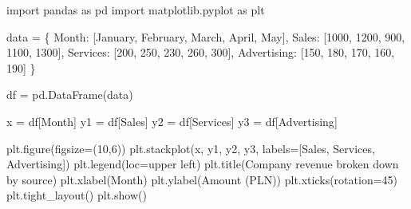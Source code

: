 \documentclass[
  english,
  letterpaper,
  DIV=11,
  numbers=noendperiod]{scrreprt}
\newenvironment{Shaded}{\begin{snugshade}}{\end{snugshade}}
\newcommand{\DecValTok}[1]{\textcolor[rgb]{0.68,0.00,0.00}{#1}}
\newcommand{\ImportTok}[1]{\textcolor[rgb]{0.00,0.46,0.62}{#1}}
\newcommand{\NormalTok}[1]{\textcolor[rgb]{0.00,0.23,0.31}{#1}}
\newcommand{\OperatorTok}[1]{\textcolor[rgb]{0.37,0.37,0.37}{#1}}
\newcommand{\StringTok}[1]{\textcolor[rgb]{0.13,0.47,0.30}{#1}}
\begin{document}
\begin{Shaded}
\begin{Highlighting}[]
\ImportTok{import}\NormalTok{ pandas }\ImportTok{as}\NormalTok{ pd}
\ImportTok{import}\NormalTok{ matplotlib.pyplot }\ImportTok{as}\NormalTok{ plt}

\NormalTok{data }\OperatorTok{=}\NormalTok{ \{}
    \StringTok{\textquotesingle{}Month\textquotesingle{}}\NormalTok{: [}\StringTok{\textquotesingle{}January\textquotesingle{}}\NormalTok{, }\StringTok{\textquotesingle{}February\textquotesingle{}}\NormalTok{, }\StringTok{\textquotesingle{}March\textquotesingle{}}\NormalTok{, }\StringTok{\textquotesingle{}April\textquotesingle{}}\NormalTok{, }\StringTok{\textquotesingle{}May\textquotesingle{}}\NormalTok{],}
    \StringTok{\textquotesingle{}Sales\textquotesingle{}}\NormalTok{: [}\DecValTok{1000}\NormalTok{, }\DecValTok{1200}\NormalTok{, }\DecValTok{900}\NormalTok{, }\DecValTok{1100}\NormalTok{, }\DecValTok{1300}\NormalTok{],}
    \StringTok{\textquotesingle{}Services\textquotesingle{}}\NormalTok{: [}\DecValTok{200}\NormalTok{, }\DecValTok{250}\NormalTok{, }\DecValTok{230}\NormalTok{, }\DecValTok{260}\NormalTok{, }\DecValTok{300}\NormalTok{],}
    \StringTok{\textquotesingle{}Advertising\textquotesingle{}}\NormalTok{: [}\DecValTok{150}\NormalTok{, }\DecValTok{180}\NormalTok{, }\DecValTok{170}\NormalTok{, }\DecValTok{160}\NormalTok{, }\DecValTok{190}\NormalTok{]}
\NormalTok{\}}

\NormalTok{df }\OperatorTok{=}\NormalTok{ pd.DataFrame(data)}

\NormalTok{x }\OperatorTok{=}\NormalTok{ df[}\StringTok{\textquotesingle{}Month\textquotesingle{}}\NormalTok{]}
\NormalTok{y1 }\OperatorTok{=}\NormalTok{ df[}\StringTok{\textquotesingle{}Sales\textquotesingle{}}\NormalTok{]}
\NormalTok{y2 }\OperatorTok{=}\NormalTok{ df[}\StringTok{\textquotesingle{}Services\textquotesingle{}}\NormalTok{]}
\NormalTok{y3 }\OperatorTok{=}\NormalTok{ df[}\StringTok{\textquotesingle{}Advertising\textquotesingle{}}\NormalTok{]}

\NormalTok{plt.figure(figsize}\OperatorTok{=}\NormalTok{(}\DecValTok{10}\NormalTok{,}\DecValTok{6}\NormalTok{))}
\NormalTok{plt.stackplot(x, y1, y2, y3, labels}\OperatorTok{=}\NormalTok{[}\StringTok{\textquotesingle{}Sales\textquotesingle{}}\NormalTok{, }\StringTok{\textquotesingle{}Services\textquotesingle{}}\NormalTok{, }\StringTok{\textquotesingle{}Advertising\textquotesingle{}}\NormalTok{])}
\NormalTok{plt.legend(loc}\OperatorTok{=}\StringTok{\textquotesingle{}upper left\textquotesingle{}}\NormalTok{)}
\NormalTok{plt.title(}\StringTok{\textquotesingle{}Company revenue broken down by source\textquotesingle{}}\NormalTok{)}
\NormalTok{plt.xlabel(}\StringTok{\textquotesingle{}Month\textquotesingle{}}\NormalTok{)}
\NormalTok{plt.ylabel(}\StringTok{\textquotesingle{}Amount (PLN)\textquotesingle{}}\NormalTok{)}
\NormalTok{plt.xticks(rotation}\OperatorTok{=}\DecValTok{45}\NormalTok{)}
\NormalTok{plt.tight\_layout()}
\NormalTok{plt.show()}
\end{Highlighting}
\end{Shaded}
\end{document}
